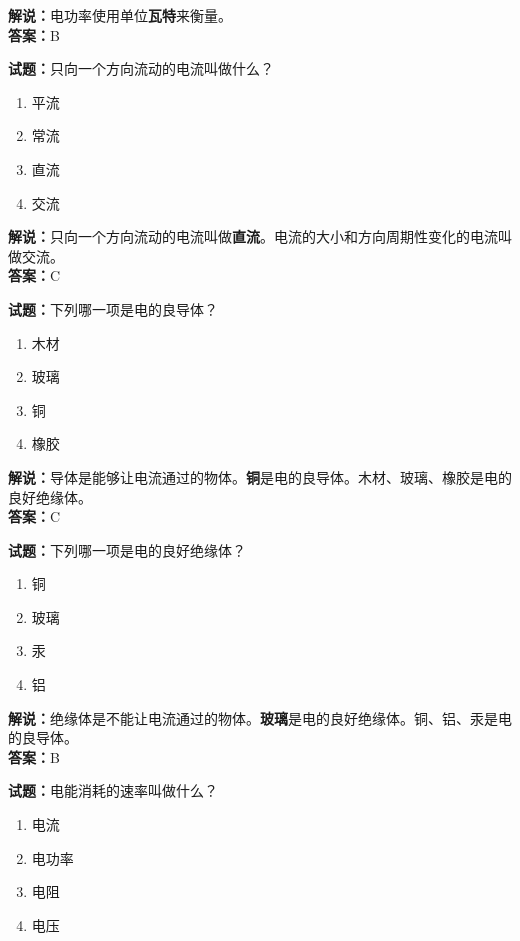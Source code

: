 \documentclass{ctexbook}
\begin{document}
\noindent\textbf{解说：}电功率使用单位\textbf{瓦特}来衡量。\\\noindent\textbf{答案：}B


\bigskip


\noindent\textbf{试题：}只向一个方向流动的电流叫做什么？

\begin{enumerate}[leftmargin=3em]
	\item 平流
	\item 常流
	\item 直流
	\item 交流
\end{enumerate}

\noindent\textbf{解说：}只向一个方向流动的电流叫做\textbf{直流}。电流的大小和方向周期性变化的电流叫做交流。\\\noindent\textbf{答案：}C

\bigskip


\noindent\textbf{试题：}下列哪一项是电的良导体？

\begin{enumerate}[leftmargin=3em]
	\item 木材
	\item 玻璃
	\item 铜
	\item 橡胶
\end{enumerate}

\noindent\textbf{解说：}导体是能够让电流通过的物体。\textbf{铜}是电的良导体。木材、玻璃、橡胶是电的良好绝缘体。\\\noindent\textbf{答案：}C


\bigskip


\noindent\textbf{试题：}下列哪一项是电的良好绝缘体？

\begin{enumerate}[leftmargin=3em]
	\item 铜
	\item 玻璃
	\item 汞
	\item 铝
\end{enumerate}

\noindent\textbf{解说：}绝缘体是不能让电流通过的物体。\textbf{玻璃}是电的良好绝缘体。铜、铝、汞是电的良导体。\\\noindent\textbf{答案：}B


\bigskip


\noindent\textbf{试题：}电能消耗的速率叫做什么？

\begin{enumerate}[leftmargin=3em]
	\item 电流
	\item 电功率
	\item 电阻
	\item 电压
\end{enumerate}
\end{document}
